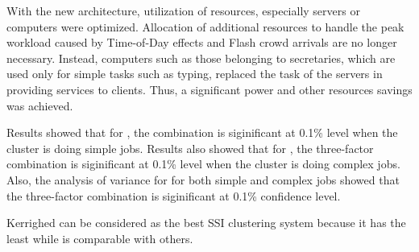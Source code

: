 \documentclass[preprint]{acm_proc_article-sp}
\begin{document}
With the new architecture, utilization of resources, especially servers or computers were optimized. Allocation of additional resources to handle the peak workload caused by Time-of-Day effects and Flash crowd arrivals are no longer necessary. Instead, computers such as those belonging to secretaries, which are used only for simple tasks such as typing, replaced the task of the servers in providing services to clients. Thus, a significant power and other resources savings was achieved.

Results showed that for , the combination  is siginificant at 0.1\% level when the cluster is doing simple jobs.  Results also showed that for , the three-factor combination  is siginificant at 0.1\% level when the cluster is doing complex jobs. Also, the analysis of variance for  for both simple and complex jobs showed that the three-factor combination  is siginificant at 0.1\% confidence level.

Kerrighed can be considered as the best SSI clustering system because it has the least  while  is comparable with others.



\end{document}
